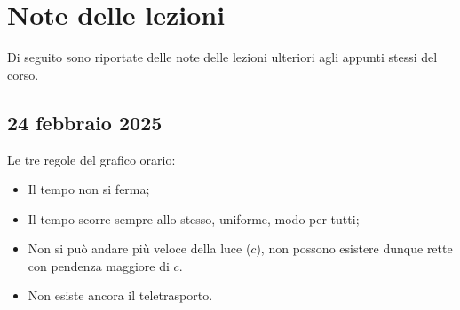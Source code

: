 \appendix 
\chapter{Note delle lezioni}
Di seguito sono riportate delle note delle lezioni ulteriori agli appunti stessi del corso.

\section{24 febbraio 2025}
\label{lez:24-02-2025}
Le tre regole del grafico orario:
\begin{itemize}
    \item Il tempo non si ferma;
    \item Il tempo scorre sempre allo stesso, uniforme, modo per tutti;
    \item Non si può andare più veloce della luce ($c$), non possono esistere dunque rette con pendenza maggiore di $c$.
    \item Non esiste ancora il teletrasporto.
\end{itemize}